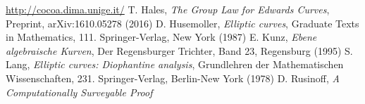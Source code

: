 \documentclass[12pt]{amsart}
\theoremstyle{plain}
\theoremstyle{remark}
\theoremstyle{definition}
\def \F {\mathbf{F}}
\begin{document}
\begin{thebibliography}{10}
\url{http://cocoa.dima.unige.it/}
T. Hales, {\em The Group Law for Edwards Curves}, Preprint,	arXiv:1610.05278 (2016)
D. Husemoller, {\em Elliptic curves},  Graduate Texts in Mathematics, 111. Springer-Verlag, New York (1987)
 E. Kunz,
  {\it Ebene algebraische Kurven},
  Der Regensburger Trichter, Band 23, Regensburg (1995)
S. Lang, {\em Elliptic curves: Diophantine analysis},
Grundlehren der Mathematischen Wissenschaften, 231. Springer-Verlag, Berlin-New York (1978)
D. Rusinoff, {\em A Computationally Surveyable Proof
}
\end{thebibliography}
\end{document}
